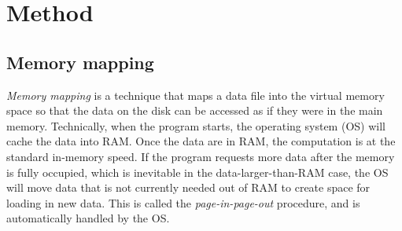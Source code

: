 
\section{Method}

%

\subsection{Memory mapping}

\textit{Memory mapping} \citep{bovet2005understanding} is a technique that maps a data file into the virtual memory space so that the data on the disk can be accessed as if they were in the main memory. Technically, when the program starts, the operating system (OS) will cache the data into RAM. Once the data are in RAM, the computation is at the standard in-memory speed. If the program requests more data after the memory is fully occupied, which is inevitable in the data-larger-than-RAM case, the OS will move data that is not currently needed out of RAM to create space for loading in new data. This is called the \textit{page-in-page-out} procedure, and is automatically handled by the OS.

